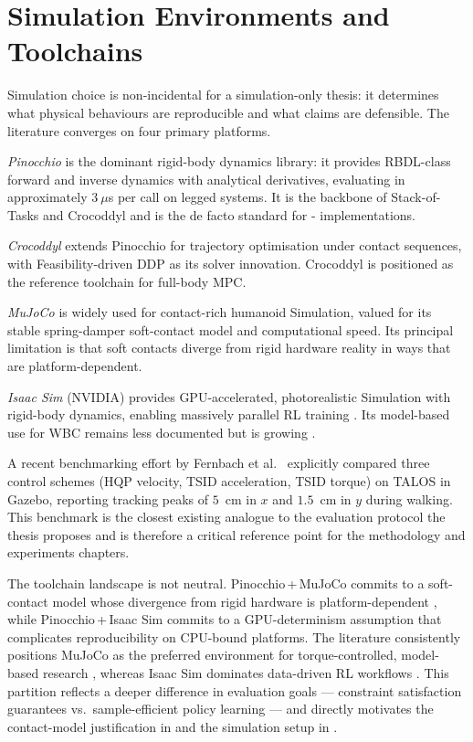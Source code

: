 \section{Simulation Environments and Toolchains}
\label{sec:sota_sim}

Simulation choice is non-incidental for a simulation-only thesis: it
determines what physical behaviours are reproducible and what claims are
defensible. The literature converges on four primary platforms.

\emph{Pinocchio} \cite{Pinocchio} is the dominant rigid-body dynamics
library: it provides RBDL-class forward and inverse dynamics with
analytical derivatives, evaluating in approximately $3~\mu$s per call on
legged systems. It is the backbone of Stack-of-Tasks and Crocoddyl
\cite{Crocoddyl} and is the de facto standard for \QP-\WBC{}
implementations.

\emph{Crocoddyl} \cite{Crocoddyl} extends Pinocchio for trajectory
optimisation under contact sequences, with Feasibility-driven DDP as its
solver innovation. Crocoddyl is positioned as the reference toolchain
for full-body MPC.

\emph{MuJoCo} \cite{MuJoCo2012} is widely used for contact-rich humanoid
Simulation, valued for its stable spring-damper soft-contact model and
computational speed. Its principal limitation is that soft contacts
diverge from rigid hardware reality in ways that are platform-dependent.

\emph{Isaac Sim} (NVIDIA) provides GPU-accelerated, photorealistic
Simulation with rigid-body dynamics, enabling massively parallel RL
training \cite{HumanoidGym2024}. Its model-based use for WBC remains
less documented but is growing \cite{PolySim2025}.

A recent benchmarking effort by Fernbach et al.\ \cite{Fernbach2018}
explicitly compared three control schemes (HQP velocity, TSID
acceleration, TSID torque) on TALOS in Gazebo, reporting \com{} tracking
peaks of $5$~cm in $x$ and $1.5$~cm in $y$ during walking. This benchmark
is the closest existing analogue to the evaluation protocol the thesis
proposes and is therefore a critical reference point for the methodology
and experiments chapters.

\begin{criticalinsight}
The toolchain landscape is not neutral. Pinocchio\,+\,MuJoCo commits to a
soft-contact model whose divergence from rigid hardware is platform-dependent
\cite{MuJoCo2012}, while Pinocchio\,+\,Isaac Sim commits to a GPU-determinism
assumption that complicates reproducibility on CPU-bound platforms. The
literature consistently positions MuJoCo as the preferred environment for
torque-controlled, model-based \WBC{} research
\cite{DelPrete2016,Koolen2016,MuJoCo2012}, whereas Isaac Sim dominates
data-driven RL workflows \cite{HumanoidGym2024,PolySim2025}. This partition
reflects a deeper difference in evaluation goals --- constraint satisfaction
guarantees vs.\ sample-efficient policy learning --- and directly motivates
the contact-model justification in  and the
simulation setup in .
\end{criticalinsight}


